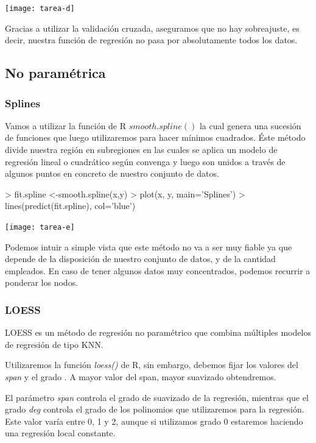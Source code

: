 \documentclass[a4paper,12pt]{article}
\begin{document}
\texttt{[image: tarea-d]}

Gracias a utilizar la validaci\'on cruzada, aseguramos que no hay sobreajuste, es decir, nuestra funci\'on de regresi\'on no pasa por absolutamente todos los datos.

\pagebreak


\subsection{No paramétrica}

\subsubsection{Splines}

Vamos a utilizar la función de R $smooth.spline()$ la cual genera una sucesión de funciones que luego utilizaremos para hacer mínimos cuadrados. Éste método divide nuestra región en subregiones en las cuales se aplica un modelo de regresión lineal o cuadrático según convenga y luego son unidos a través de algunos puntos en concreto de nuestro conjunto de datos. 

\begin{Schunk}
\begin{Sinput}
> fit.spline <-smooth.spline(x,y)
> plot(x, y, main='Splines')
> lines(predict(fit.spline), col='blue')
\end{Sinput}
\end{Schunk}
\texttt{[image: tarea-e]}

Podemos intuir a simple vista que este método no va a ser muy fiable ya que depende de la disposición de nuestro conjunto de datos, y de la cantidad empleados. En caso de tener algunos datos muy concentrados, podemos recurrir a ponderar los nodos.

\subsubsection{LOESS}

LOESS es un método de regresión no paramétrico que combina múltiples modelos de regresión de tipo KNN.

Utilizaremos la función \textit{loess()} de R, sin embargo, debemos fijar los valores del \textit{span} y el grado . A mayor valor del span, mayor suavizado obtendremos. 

El parámetro \textit{span} controla el grado de suavizado de la regresión, mientras que el grado \textit{deg} controla el grado de los polinomios que utilizaremos para la regresión. Este valor varía entre 0, 1 y 2, aunque si utilizamos grado 0 estaremos haciendo una regresión local constante.
\end{document}
